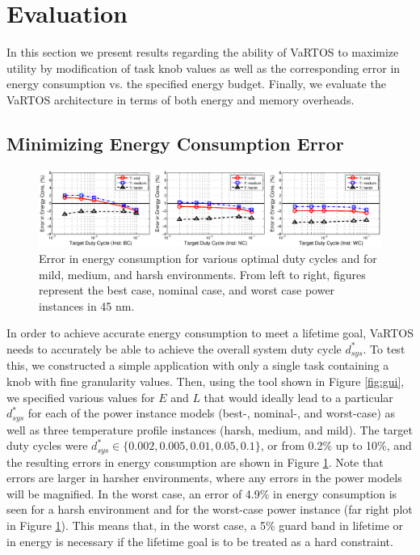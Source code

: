 \section{Evaluation}
\label{sec:evaluation}
In this section we present results regarding the ability of VaRTOS to maximize utility by modification of task knob values as well as the corresponding error in energy consumption vs. the specified energy budget.  Finally, we evaluate the VaRTOS architecture in terms of both energy and memory overheads.  

\subsection{Minimizing Energy Consumption Error}

\begin{figure}
\centering
\includegraphics[width=1\textwidth]{figures/app1_nonoise}
\caption{\label{fig:app1_dc}Error in energy consumption for various optimal duty cycles and for mild, medium, and harsh environments.  From left to right, figures represent the best case, nominal case, and worst case power instances in 45 nm.}
\end{figure}


In order to achieve accurate energy consumption to meet a lifetime goal, VaRTOS needs to accurately be able to achieve the overall system duty cycle $d_{sys}^*$.  To test this, we constructed a simple application with only a single task containing a knob with fine granularity values.  Then, using the tool shown in Figure \ref{fig:gui}, we specified various values for $E$ and $L$ that would ideally lead to a particular $d_{sys}^*$ for each of the power instance models (best-, nominal-, and worst-case) as well as three temperature profile instances (harsh, medium, and mild).  The target duty cycles were $d_{sys}^* \in \{0.002, 0.005, 0.01, 0.05, 0.1\}$, or from 0.2\% up to 10\%, and the resulting errors in energy consumption are shown in Figure \ref{fig:app1_dc}.  Note that errors are larger in harsher environments, where any errors in the power models will be magnified.  In the worst case, an error of 4.9\% in energy consumption is seen for a harsh environment and for the worst-case power instance (far right plot in Figure \ref{fig:app1_dc}). This means that, in the worst case, a 5\% guard band in lifetime or in energy is necessary if the lifetime goal is to be treated as a hard constraint. 

